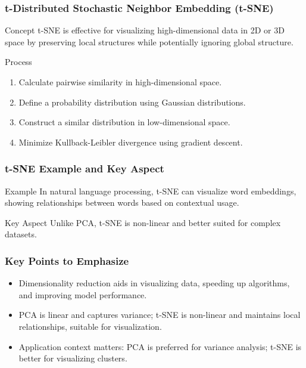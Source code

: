 \documentclass[aspectratio=169]{beamer}
\begin{document}
\begin{frame}[fragile]
    \frametitle{t-Distributed Stochastic Neighbor Embedding (t-SNE)}
    \begin{block}{Concept}
        t-SNE is effective for visualizing high-dimensional data in 2D or 3D space by preserving local structures while potentially ignoring global structure.
    \end{block}
    \begin{block}{Process}
        \begin{enumerate}
            \item Calculate pairwise similarity in high-dimensional space.
            \item Define a probability distribution using Gaussian distributions.
            \item Construct a similar distribution in low-dimensional space.
            \item Minimize Kullback-Leibler divergence using gradient descent.
        \end{enumerate}
    \end{block}
\end{frame}

\begin{frame}[fragile]
    \frametitle{t-SNE Example and Key Aspect}
    \begin{block}{Example}
        In natural language processing, t-SNE can visualize word embeddings, showing relationships between words based on contextual usage.
    \end{block}
    \begin{block}{Key Aspect}
        Unlike PCA, t-SNE is non-linear and better suited for complex datasets.
    \end{block}
\end{frame}

\begin{frame}[fragile]
    \frametitle{Key Points to Emphasize}
    \begin{itemize}
        \item Dimensionality reduction aids in visualizing data, speeding up algorithms, and improving model performance.
        \item PCA is linear and captures variance; t-SNE is non-linear and maintains local relationships, suitable for visualization.
        \item Application context matters: PCA is preferred for variance analysis; t-SNE is better for visualizing clusters.
    \end{itemize}
\end{frame}
\end{document}
